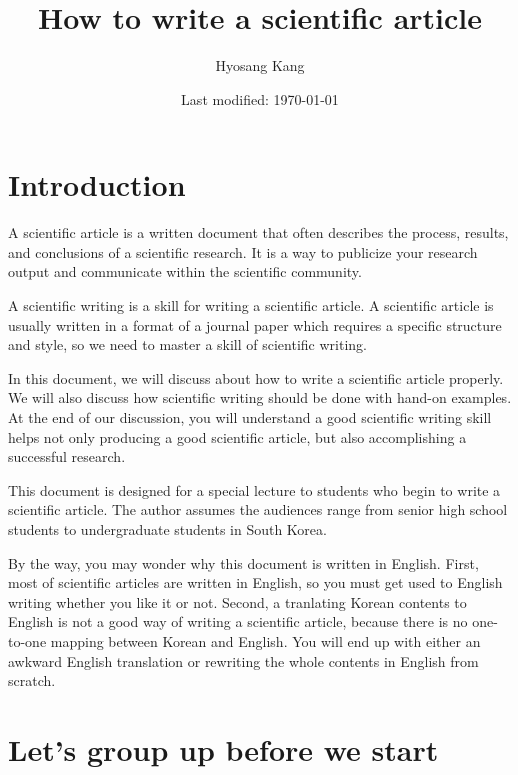\documentclass{article}
\title{How to write a scientific article}
\author{Hyosang Kang}
\date{Last modified: \today}
\begin{document}
\maketitle

\section{Introduction}

A scientific article is a written document that often describes the process, results, and conclusions of a scientific research. 
It is a way to publicize your research output and communicate within the scientific community. 

A scientific writing is a skill for writing a scientific article.
A scientific article is usually written in a format of a journal paper which requires a specific structure and style, so we need to master a skill of scientific writing.

In this document, we will discuss about how to write a scientific article properly.
We will also discuss how scientific writing should be done with hand-on examples.
At the end of our discussion, you will understand a good scientific writing skill helps not only producing a good scientific article, but also accomplishing a successful research. 

This document is designed for a special lecture to students who begin to write a scientific article.
The author assumes the audiences range from senior high school students to undergraduate students in South Korea.

By the way, you may wonder why this document is written in English.
First, most of scientific articles are written in English, so you must get used to English writing whether you like it or not.
Second, a tranlating Korean contents to English is not a good way of writing a scientific article, because there is no one-to-one mapping between Korean and English. You will end up with either an awkward English translation or rewriting the whole contents in English from scratch.



\section{Let's group up before we start}
\end{document}
